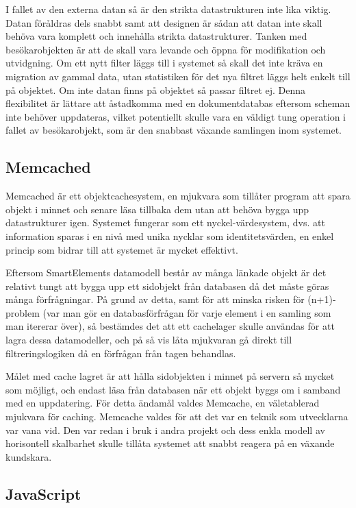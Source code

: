 I fallet av den externa datan så är den strikta datastrukturen inte lika viktig. Datan föråldras dels snabbt samt att designen är sådan att datan inte skall behöva vara komplett och innehålla strikta datastrukturer. Tanken med besökarobjekten är att de skall vara levande och öppna för modifikation och utvidgning. Om ett nytt filter läggs till i systemet så skall det inte kräva en migration av gammal data, utan statistiken för det nya filtret läggs helt enkelt till på objektet. Om inte datan finns på objektet så passar filtret ej. Denna flexibilitet är lättare att åstadkomma med en dokumentdatabas eftersom scheman inte behöver uppdateras, vilket potentiellt skulle vara en väldigt tung operation i fallet av besökarobjekt, som är den snabbast växande samlingen inom systemet.

\subsection{Memcached}

Memcached är ett objektcachesystem, en mjukvara som tillåter program att spara objekt i minnet och senare läsa tillbaka dem utan att behöva bygga upp datastrukturer igen. Systemet fungerar som ett nyckel-värdesystem, dvs. att information sparas i en nivå med unika nycklar som identitetsvärden, en enkel princip som bidrar till att systemet är mycket effektivt. \citep{memcachedwiki}

Eftersom SmartElements datamodell består av många länkade objekt är det relativt tungt att bygga upp ett sidobjekt från databasen då det måste göras många förfrågningar. På grund av detta, samt för att minska risken för (n+1)-problem (var man gör en databasförfrågan för varje element i en samling som man itererar över), så bestämdes det att ett cachelager skulle användas för att lagra dessa datamodeller, och på så vis låta mjukvaran gå direkt till filtreringslogiken då en förfrågan från tagen behandlas.

Målet med cache lagret är att hålla sidobjekten i minnet på servern så mycket som möjligt, och endast läsa från databasen när ett objekt byggs om i samband med en uppdatering. För detta ändamål valdes Memcache, en väletablerad mjukvara för caching. Memcache valdes för att det var en teknik som utvecklarna var vana vid. Den var redan i bruk i andra projekt och dess enkla modell av horisontell skalbarhet skulle tillåta systemet att snabbt reagera på en växande kundskara.

\subsection{JavaScript}

